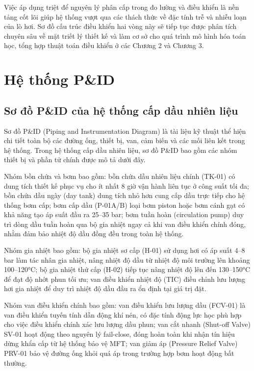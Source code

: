 \documentclass[../main.tex]{subfiles}
\begin{document}
Việc áp dụng triệt để nguyên lý phân cấp trong đo lường và điều khiển là nền tảng cốt lõi giúp hệ thống vượt qua các thách thức về đặc tính trễ và nhiễu loạn của lò hơi. Sơ đồ cấu trúc điều khiển hai vòng này sẽ tiếp tục được phân tích chuyên sâu về mặt triết lý thiết kế và làm cơ sở cho quá trình mô hình hóa toán học, tổng hợp thuật toán điều khiển ở các Chương 2 và Chương 3.

\section{Hệ thống P\&ID}

\subsection{Sơ đồ P\&ID của hệ thống cấp dầu nhiên liệu}

Sơ đồ P\&ID (Piping and Instrumentation Diagram) là tài liệu kỹ thuật thể hiện chi tiết toàn bộ các đường ống, thiết bị, van, cảm biến và các mối liên kết trong hệ thống. Trong hệ thống cấp dầu nhiên liệu, sơ đồ P\&ID bao gồm các nhóm thiết bị và phần tử chính được mô tả dưới đây.

Nhóm bồn chứa và bơm bao gồm: bồn chứa dầu nhiên liệu chính (TK-01) có dung tích thiết kế phục vụ cho ít nhất 8 giờ vận hành liên tục ở công suất tối đa; bồn chứa dầu ngày (day tank) dung tích nhỏ hơn cung cấp dầu trực tiếp cho hệ thống bơm cấp; bơm cấp dầu (P-01A/B) loại bơm piston hoặc bơm cánh gạt có khả năng tạo áp suất đầu ra 25--35 bar; bơm tuần hoàn (circulation pump) duy trì dòng dầu tuần hoàn qua bộ gia nhiệt ngay cả khi van điều khiển chính đóng, nhằm đảm bảo nhiệt độ dầu đồng đều trong toàn hệ thống.

Nhóm gia nhiệt bao gồm: bộ gia nhiệt sơ cấp (H-01) sử dụng hơi có áp suất 4--8 bar làm tác nhân gia nhiệt, nâng nhiệt độ dầu từ nhiệt độ môi trường lên khoảng 100--120°C; bộ gia nhiệt thứ cấp (H-02) tiếp tục nâng nhiệt độ lên đến 130--150°C để đạt độ nhớt phun tối ưu; van điều khiển nhiệt độ (TIC) điều chỉnh lưu lượng hơi gia nhiệt để duy trì nhiệt độ dầu đầu ra ổn định tại giá trị đặt.

Nhóm van điều khiển chính bao gồm: van điều khiển lưu lượng dầu (FCV-01) là van điều khiển tuyến tính dẫn động khí nén, có đặc tính động lực học phù hợp cho việc điều khiển chính xác lưu lượng dầu phun; van cắt nhanh (Shut-off Valve) SV-01 hoạt động theo nguyên lý fail-close, đóng hoàn toàn khi nhận tín hiệu dừng khẩn cấp từ hệ thống bảo vệ MFT; van giảm áp (Pressure Relief Valve) PRV-01 bảo vệ đường ống khỏi quá áp trong trường hợp bơm hoạt động bất thường.
\end{document}
